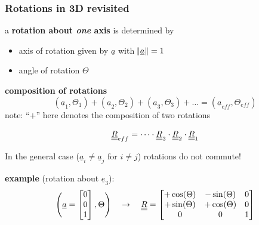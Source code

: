 \begin{frame}
  \frametitle{Rotations in 3D revisited}
  
  a \textbf{rotation about \textit{one} axis} is determined by
  \begin{itemize}
    \item axis of rotation given by $\underline{a}$ with $\norm{\underline{a}} = 1$
    \item angle of rotation $\Theta$
  \end{itemize}
  \vspace{0.6em}
  
  \textbf{composition of rotations}
  \begin{displaymath}
    \left( \underline{a}_1, \Theta_1 \right) + \left( \underline{a}_2, \Theta_2 \right) + \left( \underline{a}_3, \Theta_3 \right) + \dots = \left( \underline{a}_{eff}, \Theta_{eff} \right)
  \end{displaymath}
  note: ``$+$'' here denotes the composition of two rotations
  
  \begin{displaymath}
    \underline{\underline{R}}_{eff} = \dots \cdot \underline{\underline{R}}_3 \cdot \underline{\underline{R}}_2 \cdot \underline{\underline{R}}_1
  \end{displaymath}
  
  In the general case ($\underline{a}_i \neq \underline{a}_j \text{ for } i \neq j$) rotations do not commute!
  \vspace{1em}
  
  \textbf{example} (rotation about $\underline{e}_3$):
  \begin{displaymath}
    \Biggl( \underline{a} =
    \begin{bmatrix}
      0 \\ 0 \\ 1
    \end{bmatrix}, \Theta \Biggr) \quad \rightarrow \quad
    \underline{\underline{R}} =
    \begin{bmatrix}
      +\cos(\Theta) & -\sin(\Theta) & 0 \\
      +\sin(\Theta) & +\cos(\Theta) & 0 \\
      0 & 0 & 1
    \end{bmatrix}
  \end{displaymath}
\end{frame}

